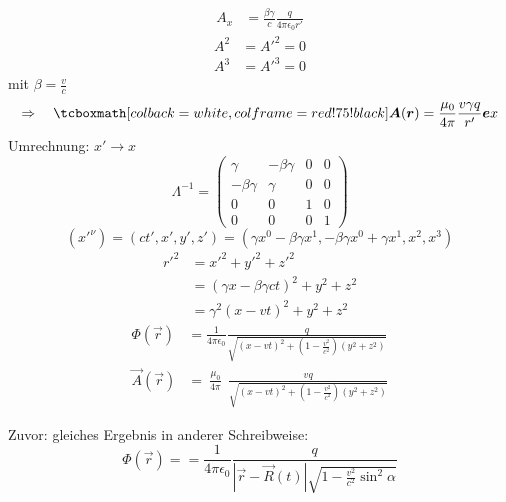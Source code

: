 \begin{enumerate}[1)]
\begin{align*}
	A_{x }&=  \frac{\beta \gamma}{c} \frac{q}{4 \pi \epsilon_0 r'}
	\end{align*}
	\begin{align*}
	A^{2} &= A'^{2} = 0\\
	A^{3} &= A'^{3} = 0
	\end{align*}
	mit $ \beta = \frac{v}{c} $
	\begin{equation*}
	\Rightarrow \quad \rmbox{\vec{A}(\vec{r}) = \frac{\mu_0}{4 \pi} \frac{v \gamma q}{r'} \vec{e}x}
	\end{equation*}
	Umrechnung: $ x' \to x $
	\begin{equation*}
	\Lambda^{-1} = \begin{pmatrix}
	\gamma & - \beta \gamma & 0 & 0 \\
	- \beta \gamma & \gamma & 0 & 0 \\
	0 & 0 & 1 & 0 \\
	0 & 0 & 0 & 1
	\end{pmatrix}
	\end{equation*}
	\begin{equation*}
	(x'^{\nu}) = ( ct', x', y', z') = (\gamma x^{0} - \beta \gamma x^{1}, - \beta \gamma x^{0} + \gamma x^{1}, x^{2}, x^{3})
	\end{equation*}
	\begin{align*}
	r'^{2} &= x'^2 + y'^2 + z'^2\\
	&= (\gamma x - \beta \gamma ct)^2 + y^2 + z^2\\
	&= \gamma^2 (x - vt)^2 + y^2 + z^2
	\end{align*}
	\begin{align*}
	\Phi(\vec{r}) &= \frac{1}{4 \pi \epsilon_0}\frac{q}{\sqrt{(x - vt)^2 + (1 - \frac{v^2}{c^2})(y^2 + z^2)}} \\
	\vec{A}(\vec{r}) &= \ \frac{\mu_0}{4 \pi} \ \: \frac{v q}{\sqrt{(x - vt)^2 + (1 - \frac{v^2}{c^2})(y^2 + z^2)}}
	\end{align*}
	\begin{minipage}{.6\linewidth}
		Zuvor: gleiches Ergebnis in anderer Schreibweise:
		\begin{equation*}
		\Phi(\vec{r}) = = \frac{1}{4 \pi \epsilon_0} \frac{q}{|\vec{r} - \vec{R}(t)| \sqrt{1 - \frac{v^2}{c^2} \sin^2 \alpha}}
		\end{equation*}
	\end{minipage}%
	\begin{minipage}{.4\linewidth}
		\flushright
\end{minipage}
\end{enumerate}
